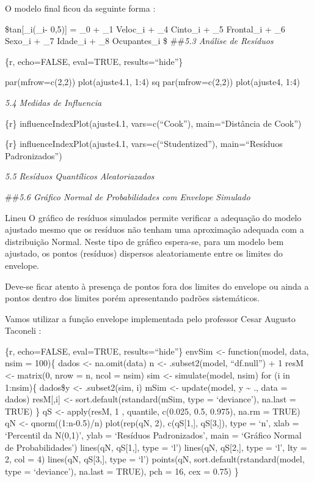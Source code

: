 \documentclass[
]{article}
\begin{document}
O modelo final ficou da seguinte forma :

\$tan{[}\pi\_i(\mu\_i- 0,5){]} = \beta\_0 + \beta\_1 Veloc\_i + \beta\_4
Cinto\_i + \beta\_5 Frontal\_i + \beta\_6 Sexo\_i + \beta\_7 Idade\_i +
\beta\_8 Ocupantes\_i \$ \#\#\emph{5.3 Análise de Resíduos}

\{r, echo=FALSE, eval=TRUE, results=``hide''\}

par(mfrow=c(2,2)) plot(ajuste4.1, 1:4) sq par(mfrow=c(2,2))
plot(ajuste4, 1:4)

\emph{5.4 Medidas de Influencia}

\{r\} influenceIndexPlot(ajuste4.1, vars=c(``Cook''), main=``Distância
de Cook'')

\{r\} influenceIndexPlot(ajuste4.1, vars=c(``Studentized''),
main=``Resíduos Padronizados'')

\emph{5.5 Resíduos Quantílicos Aleatoriazados}

\#\#\emph{5.6 Gráfico Normal de Probabilidades com Envelope Simulado}

Lineu O gráfico de resíduos simulados permite verificar a adequação do
modelo ajustado mesmo que os resíduos não tenham uma aproximação
adequada com a distribuição Normal. Neste tipo de gráfico espera-se,
para um modelo bem ajustado, os pontos (resíduos) dispersos
aleatoriamente entre os limites do envelope.

Deve-se ficar atento à presença de pontos fora dos limites do envelope
ou ainda a pontos dentro dos limites porém apresentando padrões
sistemáticos.

Vamos utilizar a função envelope implementada pelo professor Cesar
Augusto Taconeli :

\{r, echo=FALSE, eval=TRUE, results=``hide''\} envSim \textless-
function(model, data, nsim = 100)\{ dados \textless- na.omit(data) n
\textless- .subset2(model, ``df.null'') + 1 resM \textless- matrix(0,
nrow = n, ncol = nsim) sim \textless- simulate(model, nsim) for (i in
1:nsim)\{ dados\$y \textless- .subset2(sim, i) mSim \textless-
update(model, y \textasciitilde{} ., data = dados) resM{[},i{]}
\textless- sort.default(rstandard(mSim, type = `deviance'), na.last =
TRUE) \} qS \textless- apply(resM, 1 , quantile, c(0.025, 0.5, 0.975),
na.rm = TRUE) qN \textless- qnorm((1:n-0.5)/n) plot(rep(qN, 2),
c(qS{[}1,{]}, qS{[}3,{]}), type = `n', xlab = `Percentil da N(0,1)',
ylab = `Resíduos Padronizados', main = `Gráfico Normal de
Probabilidades') lines(qN, qS{[}1,{]}, type = `l') lines(qN, qS{[}2,{]},
type = `l', lty = 2, col = 4) lines(qN, qS{[}3,{]}, type = `l')
points(qN, sort.default(rstandard(model, type = `deviance'), na.last =
TRUE), pch = 16, cex = 0.75) \}
\end{document}
